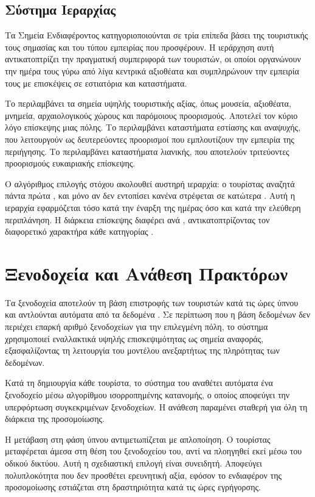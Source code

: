 \subsection{Σύστημα Ιεραρχίας }

Τα Σημεία Ενδιαφέροντος κατηγοριοποιούνται σε τρία επίπεδα
βάσει της τουριστικής τους σημασίας και του τύπου εμπειρίας
που προσφέρουν. Η ιεράρχηση αυτή αντικατοπτρίζει την πραγματική
συμπεριφορά των τουριστών, οι οποίοι οργανώνουν την ημέρα τους
γύρω από λίγα κεντρικά αξιοθέατα και συμπληρώνουν την εμπειρία
τους με επισκέψεις σε εστιατόρια και καταστήματα.

Το  περιλαμβάνει τα σημεία υψηλής τουριστικής αξίας,
όπως μουσεία, αξιοθέατα, μνημεία, αρχαιολογικούς χώρους και
παρόμοιους προορισμούς. Αποτελεί τον κύριο λόγο επίσκεψης μιας
πόλης. Το  περιλαμβάνει καταστήματα εστίασης και
αναψυχής, που λειτουργούν ως δευτερεύοντες προορισμοί που
εμπλουτίζουν την εμπειρία της περιήγησης. Το 
περιλαμβάνει καταστήματα λιανικής, που αποτελούν τριτεύοντες
προορισμούς ευκαιριακής επίσκεψης.

Ο αλγόριθμος επιλογής στόχου ακολουθεί αυστηρή ιεραρχία:
ο τουρίστας αναζητά πάντα πρώτα , και μόνο αν
δεν εντοπίσει κανένα στρέφεται σε κατώτερα . Αυτή
η ιεραρχία εφαρμόζεται τόσο κατά την έναρξη της ημέρας όσο
και κατά την ελεύθερη περιπλάνηση. Η διάρκεια επίσκεψης
διαφέρει ανά , αντικατοπτρίζοντας τον διαφορετικό
χαρακτήρα κάθε κατηγορίας .

\section{Ξενοδοχεία και Ανάθεση Πρακτόρων}

Τα ξενοδοχεία αποτελούν τη βάση επιστροφής των τουριστών κατά
τις ώρες ύπνου και αντλούνται αυτόματα από τα δεδομένα .
Σε περίπτωση που η βάση δεδομένων δεν περιέχει επαρκή αριθμό
ξενοδοχείων για την επιλεγμένη πόλη, το σύστημα χρησιμοποιεί
εναλλακτικά  υψηλής επισκεψιμότητας ως σημεία αναφοράς,
εξασφαλίζοντας τη λειτουργία του μοντέλου ανεξαρτήτως της
πληρότητας των δεδομένων.

Κατά τη δημιουργία κάθε τουρίστα, το σύστημα του αναθέτει
αυτόματα ένα ξενοδοχείο μέσω αλγορίθμου ισορροπημένης κατανομής,
ο οποίος αποφεύγει την υπερφόρτωση συγκεκριμένων ξενοδοχείων.
Η ανάθεση παραμένει σταθερή για όλη τη διάρκεια της προσομοίωσης.

Η μετάβαση στη φάση ύπνου αντιμετωπίζεται με απλοποίηση.
Ο τουρίστας μεταφέρεται άμεσα στη θέση του ξενοδοχείου του,
αντί να πλοηγηθεί εκεί μέσω του οδικού δικτύου. Αυτή η
σχεδιαστική επιλογή είναι συνειδητή. Αποφεύγει πολυπλοκότητα
που δεν προσθέτει ερευνητική αξία, εφόσον το ενδιαφέρον της
προσομοίωσης εστιάζεται στη δραστηριότητα κατά τις ώρες εγρήγορσης.